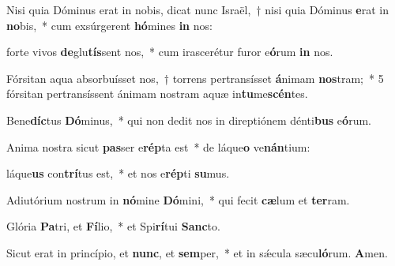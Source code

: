 \item Nisi quia Dóminus erat in nobis, dicat nunc Israël,~† nisi quia Dóminus \textbf{e}rat in \textbf{no}bis,~* cum exsúrgerent \textbf{hó}mines \textbf{in} nos:

\item forte vivos \textbf{de}glu\textbf{tís}sent nos,~* cum irascerétur furor e\textbf{ó}rum \textbf{in} nos.

\item Fórsitan aqua absorbuísset nos,~† torrens pertransísset \textbf{á}nimam \textbf{nos}tram;~* 5 fórsitan pertransíssent ánimam nostram aquæ in\textbf{tu}me\textbf{scén}tes.

\item Bene\textbf{díc}tus \textbf{Dó}minus,~* qui non dedit nos in direptiónem dénti\textbf{bus} e\textbf{ó}rum.

\item Anima nostra sicut \textbf{pas}ser e\textbf{rép}ta est~* de láque\textbf{o} ve\textbf{nán}tium:

\item láque\textbf{us} con\textbf{trí}tus est,~* et nos e\textbf{rép}ti \textbf{su}mus.

\item Adiutórium nostrum in \textbf{nó}mine \textbf{Dó}mini,~* qui fecit \textbf{cæ}lum et \textbf{ter}ram.

\item Glória \textbf{Pa}tri, et \textbf{Fí}lio,~* et Spi\textbf{rí}tui \textbf{Sanc}to.

\item Sicut erat in princípio, et \textbf{nunc}, et \textbf{sem}per,~* et in sǽcula sæcu\textbf{ló}rum. \textbf{A}men.